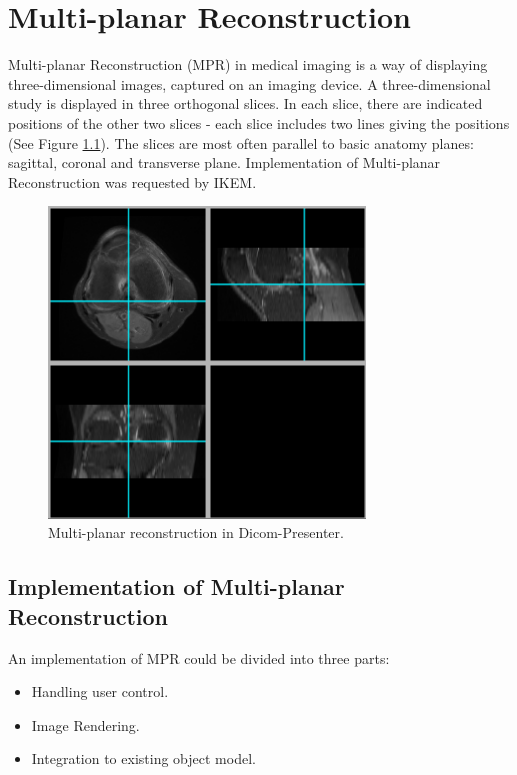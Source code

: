 \chapter{Multi-planar Reconstruction}
\vspace{-10mm}
\label{multiplanar}

Multi-planar Reconstruction (MPR) in medical imaging is a way of displaying three-dimensional images, captured on an imaging device. A three-dimensional study is displayed in three orthogonal slices. In each slice, there are indicated positions of the other two slices - each slice includes two lines giving the positions (See Figure \ref{fig:multiplanar}). The slices are most often parallel to basic anatomy planes\cite{ctteachingmanual}: sagittal, coronal and transverse plane.  Implementation of Multi-planar Reconstruction was requested by IKEM.

\begin{figure}
 	\caption{Multi-planar reconstruction in Dicom-Presenter.\label{fig:multiplanar}}
	\begin{center}
	\includegraphics[width=0.75\textwidth]{Text/IMG/MultiPlanar.png}
	\end{center}
\end{figure}

\section{Implementation of Multi-planar Reconstruction}

An implementation of MPR could be divided into three parts:

\begin{itemize}
\item Handling user control. %
\item Image Rendering. %
\item Integration to existing object model. %
\end{itemize}

